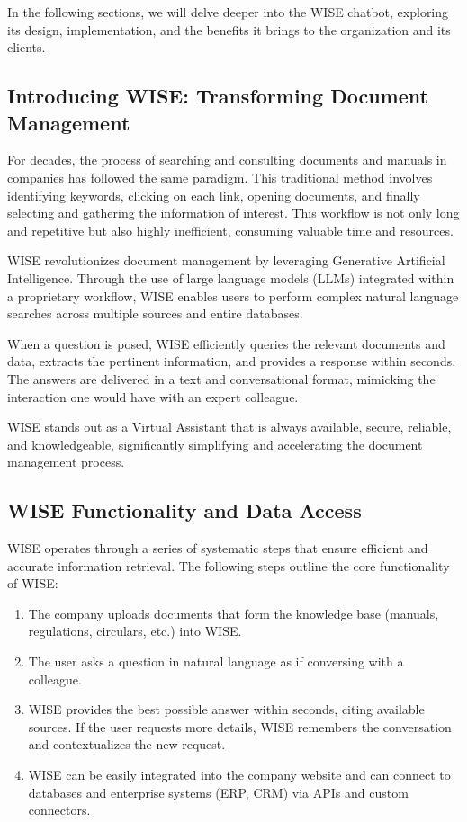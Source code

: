 In the following sections, we will delve deeper into the WISE chatbot, exploring its design, implementation, and the benefits it brings to the organization and its clients.

\subsection{Introducing WISE: Transforming Document Management}

For decades, the process of searching and consulting documents and manuals in companies has followed the same paradigm. This traditional method involves identifying keywords, clicking on each link, opening documents, and finally selecting and gathering the information of interest. This workflow is not only long and repetitive but also highly inefficient, consuming valuable time and resources.

WISE revolutionizes document management by leveraging Generative Artificial Intelligence. Through the use of large language models (LLMs) integrated within a proprietary workflow, WISE enables users to perform complex natural language searches across multiple sources and entire databases. 

When a question is posed, WISE efficiently queries the relevant documents and data, extracts the pertinent information, and provides a response within seconds. The answers are delivered in a text and conversational format, mimicking the interaction one would have with an expert colleague. 

WISE stands out as a Virtual Assistant that is always available, secure, reliable, and knowledgeable, significantly simplifying and accelerating the document management process.

\subsection{WISE Functionality and Data Access}

WISE operates through a series of systematic steps that ensure efficient and accurate information retrieval. The following steps outline the core functionality of WISE:

\begin{enumerate}
    \item The company uploads documents that form the knowledge base (manuals, regulations, circulars, etc.) into WISE.
    \item The user asks a question in natural language as if conversing with a colleague.
    \item WISE provides the best possible answer within seconds, citing available sources. If the user requests more details, WISE remembers the conversation and contextualizes the new request.
    \item WISE can be easily integrated into the company website and can connect to databases and enterprise systems (ERP, CRM) via APIs and custom connectors.
\end{enumerate}

